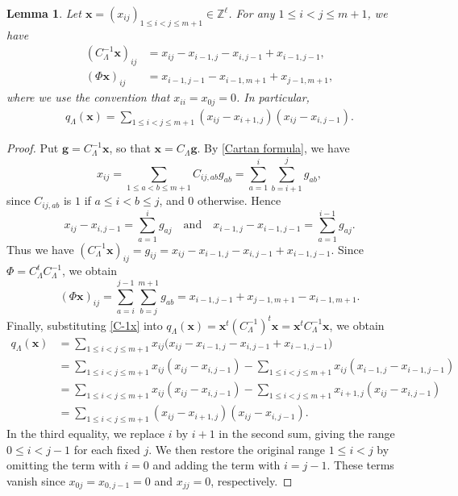 \documentclass[11pt,a4paper]{amsart}
\newtheorem{lemma}[theorem]{Lemma}
\theoremstyle{definition}
\numberwithin{equation}{section}
\newcommand{\Z}{\mathbb{Z}}
\newcommand{\x}{\mathbf{x}}
\newcommand{\g}{\mathbf{g}}
\newcommand{\0}{\mathbf{0}}
\begin{document}
	\begin{lemma} 
		 Let $\x=(x_{ij})_{1\le i<j\le m+1}\in \Z^{\ell}$. For any $1\le i<j \le  m+1$, we have
		 \begin{align}
		 	(C_\Lambda^{-1}\x)_{ij}
		 	&=x_{ij}-x_{i-1,j}-x_{i,j-1}+x_{i-1,j-1}, \label{C-1x}\\
		 	(\Phi\x)_{ij}&=x_{i-1,j-1}-x_{i-1,m+1}+x_{j-1,m+1},\label{Phix_ij}
		 \end{align}
		 where we use the convention that $x_{ii}=x_{0j}=0$. In particular, 
		 \begin{align}\label{q_Lambda(x)}
		 q_{\Lambda}(\x)=\sum_{1\le i <j \le m+1}(x_{ij}-x_{i+1,j})(x_{ij}-x_{i,j-1}).
		 \end{align}
		
	\end{lemma}
	\begin{proof} Put $\g=C_\Lambda^{-1}\x$, so that $\x=C_\Lambda\g$.
		By \eqref{Cartan formula},  we have
		\[
		x_{ij}
		=\sum_{1\le a<b\le m+1}C_{ij,ab}g_{ab}
		=\sum_{a=1}^{i}\sum_{b=i+1}^{j}g_{ab},
		\]
		since $C_{ij,ab}$ is $1$ if $a\le i<b\le j$,
		and $0$ otherwise.
		Hence
		\[
		x_{ij}-x_{i,j-1}=\sum_{a=1}^{i}g_{aj}
		\quad\text{and}\quad
		x_{i-1,j}-x_{i-1,j-1}=\sum_{a=1}^{i-1}g_{aj}.
		\]
		Thus we have
		$(C_\Lambda^{-1}\x)_{ij}
		=g_{ij}
		=x_{ij}-x_{i-1,j}-x_{i,j-1}+x_{i-1,j-1}$. 		
		Since $\Phi=C_\Lambda^tC_\Lambda^{-1}$, we obtain
		\[
		(\Phi\x)_{ij}
		=\sum_{a=i}^{j-1}\sum_{b=j}^{m+1}
		g_{ab}
		=x_{i-1,j-1}+x_{j-1,m+1}-x_{i-1,m+1}.
		\]
		Finally, substituting \eqref{C-1x} into
		$q_\Lambda(\x)=\x^t (C_\Lambda^{-1})^t\x=\x^tC_\Lambda^{-1}\x$, we obtain
		\[
		\begin{aligned}
			q_\Lambda(\x)
			&=\sum_{1\le i<j\le m+1}
			x_{ij}\bigl(x_{ij}-x_{i-1,j}
			-x_{i,j-1}+x_{i-1,j-1}\bigr)\\
			&=\sum_{1\le i<j\le m+1}
			x_{ij}(x_{ij}-x_{i,j-1})
			-\sum_{1\le i<j\le m+1}
			x_{ij}(x_{i-1,j}-x_{i-1,j-1})\\
			&=\sum_{1\le i<j\le m+1}
			x_{ij}(x_{ij}-x_{i,j-1})
			-\sum_{1\le i<j\le m+1}
			x_{i+1,j}(x_{ij}-x_{i,j-1})\\
			&=\sum_{1\le i<j\le m+1}
			(x_{ij}-x_{i+1,j})(x_{ij}-x_{i,j-1}).
		\end{aligned}
		\]
		In the third equality, we replace $i$ by $i+1$ in the second
		sum, giving the range $0\le i<j-1$ for each fixed $j$.
		We then restore the original range $1\le i<j$ by omitting the term
		with $i=0$ and adding the term with $i=j-1$. These terms vanish
		since $x_{0j}=x_{0,j-1}=0$ and $x_{jj}=0$, respectively.
	\end{proof}
	
\end{document}
